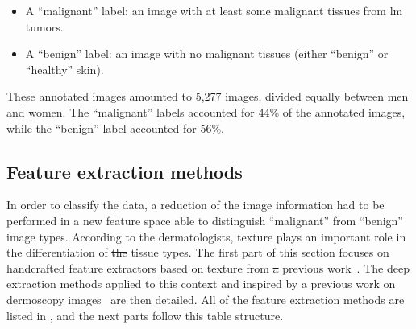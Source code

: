 \documentclass[journal,article,accept,moreauthors,pdftex, applsci]{Definitions/mdpi}
\providecommand{\DIFdel}[1]{{\protect\color{red}\sout{#1}}}                      %
\providecommand{\DIFdelbegin}{} %
\providecommand{\DIFdelend}{} %
\begin{document}
\begin{itemize}
\item A “malignant” label: an image with at least some malignant tissues from \ac{lm} tumors.
\item A “benign” label: an image with no malignant tissues (either “benign” or “healthy” skin).
\end{itemize}
These annotated images amounted to 5,277 images, divided equally between men and women. The “malignant” labels accounted for 44\% of the annotated images, while the “benign” label accounted for 56\%.\par

\subsection{Feature extraction methods}
\label{sec:features}
In order to classify the data, a reduction of the image information had to be performed in a new feature space able to distinguish “malignant” from “benign” image types. According to the dermatologists, texture plays an important role in the differentiation of \DIFdelbegin \DIFdel{the }\DIFdelend tissue types. The first part of this section focuses on handcrafted feature extractors based on texture from \DIFdelbegin \DIFdel{a }\DIFdelend previous work~\cite{Wiltgen2008}. The deep extraction methods applied to this context and inspired by a previous work on dermoscopy images~\cite{Esteva2017} are then detailed. All of the feature extraction methods are listed in , and the next parts follow this table structure.\par
\end{document}
